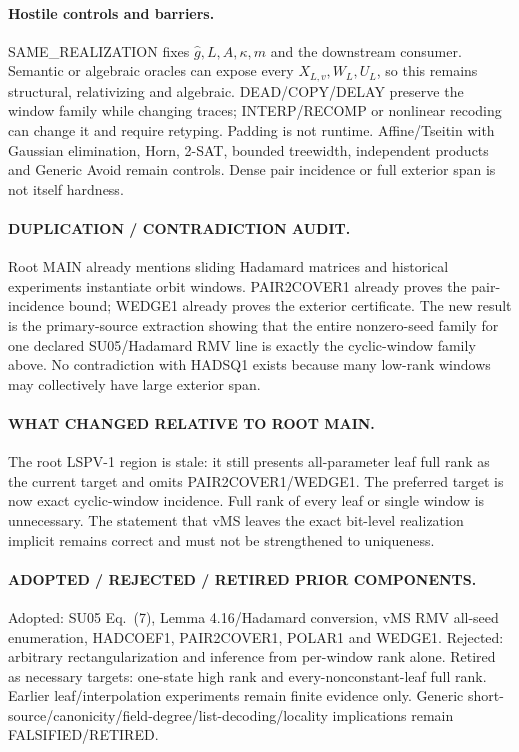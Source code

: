 \documentclass[11pt]{article}
\begin{document}
\paragraph{Hostile controls and barriers.}
SAME_REALIZATION fixes \(\widehat g,L,A,\kappa,m\) and the downstream consumer. Semantic or algebraic oracles can expose every \(X_{L,v},W_L,U_L\), so this remains structural, relativizing and algebraic. DEAD/COPY/DELAY preserve the window family while changing traces; INTERP/RECOMP or nonlinear recoding can change it and require retyping. Padding is not runtime. Affine/Tseitin with Gaussian elimination, Horn, 2-SAT, bounded treewidth, independent products and Generic Avoid remain controls. Dense pair incidence or full exterior span is not itself hardness.

\paragraph{DUPLICATION / CONTRADICTION AUDIT.}
Root MAIN already mentions sliding Hadamard matrices and historical experiments instantiate orbit windows. PAIR2COVER1 already proves the pair-incidence bound; WEDGE1 already proves the exterior certificate. The new result is the primary-source extraction showing that the entire nonzero-seed family for one declared SU05/Hadamard RMV line is exactly the cyclic-window family above. No contradiction with HADSQ1 exists because many low-rank windows may collectively have large exterior span.

\paragraph{WHAT CHANGED RELATIVE TO ROOT MAIN.}
The root LSPV-1 region is stale: it still presents all-parameter leaf full rank as the current target and omits PAIR2COVER1/WEDGE1. The preferred target is now exact cyclic-window incidence. Full rank of every leaf or single window is unnecessary. The statement that vMS leaves the exact bit-level realization implicit remains correct and must not be strengthened to uniqueness.

\paragraph{ADOPTED / REJECTED / RETIRED PRIOR COMPONENTS.}
Adopted: SU05 Eq.~(7), Lemma 4.16/Hadamard conversion, vMS RMV all-seed enumeration, HADCOEF1, PAIR2COVER1, POLAR1 and WEDGE1. Rejected: arbitrary rectangularization and inference from per-window rank alone. Retired as necessary targets: one-state high rank and every-nonconstant-leaf full rank. Earlier leaf/interpolation experiments remain finite evidence only. Generic short-source/canonicity/field-degree/list-decoding/locality implications remain FALSIFIED/RETIRED.
\end{document}
